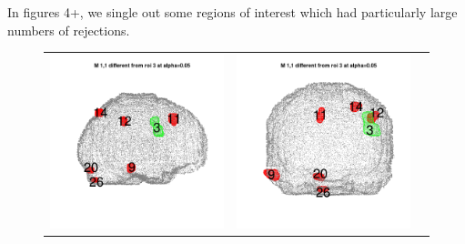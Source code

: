 \documentclass[12pt]{article}
\begin{document}
In figures 4+, we single out some regions of interest which had particularly large numbers of rejections.

\begin{figure}[h]
\centering
\begin{tabular}{ccc}
\includegraphics[scale = 0.24]{../a7plots/d_1r_3_view1.png} & 
\includegraphics[scale = 0.24]{../a7plots/d_1r_3_view2.png} & 

\end{tabular}
\end{figure}
\end{document}
